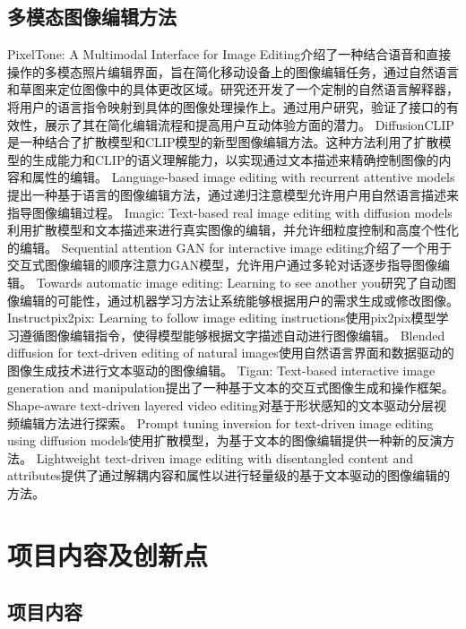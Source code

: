 \documentclass[a4paper,AutoFakeBold,oneside,12pt]{book}
\begin{document}
\subsection{多模态图像编辑方法}
PixelTone: A Multimodal Interface for Image Editing\cite{laput2013pixeltone}介绍了一种结合语音和直接操作的多模态照片编辑界面，旨在简化移动设备上的图像编辑任务，通过自然语言和草图来定位图像中的具体更改区域。研究还开发了一个定制的自然语言解释器，将用户的语言指令映射到具体的图像处理操作上。通过用户研究，验证了接口的有效性，展示了其在简化编辑流程和提高用户互动体验方面的潜力。
DiffusionCLIP\cite{kim2022diffusionclip}是一种结合了扩散模型和CLIP\cite{radford2021learning}模型的新型图像编辑方法。这种方法利用了扩散模型的生成能力和CLIP的语义理解能力，以实现通过文本描述来精确控制图像的内容和属性的编辑。
Language-based image editing with recurrent attentive models\cite{chen2018language}提出一种基于语言的图像编辑方法，通过递归注意模型允许用户用自然语言描述来指导图像编辑过程。
Imagic: Text-based real image editing with diffusion models\cite{kawar2023imagic}利用扩散模型和文本描述来进行真实图像的编辑，并允许细粒度控制和高度个性化的编辑。
Sequential attention GAN for interactive image editing\cite{cheng2020sequential}介绍了一个用于交互式图像编辑的顺序注意力GAN模型，允许用户通过多轮对话逐步指导图像编辑。
Towards automatic image editing: Learning to see another you\cite{ghodrati2015towards}研究了自动图像编辑的可能性，通过机器学习方法让系统能够根据用户的需求生成或修改图像。
Instructpix2pix: Learning to follow image editing instructions\cite{brooks2023instructpix2pix}使用pix2pix模型学习遵循图像编辑指令，使得模型能够根据文字描述自动进行图像编辑。
Blended diffusion for text-driven editing of natural images\cite{avrahami2022blended}使用自然语言界面和数据驱动的图像生成技术进行文本驱动的图像编辑。
Tigan: Text-based interactive image generation and manipulation\cite{zhou2022tigan}提出了一种基于文本的交互式图像生成和操作框架。
Shape-aware text-driven layered video editing\cite{lee2023shape}对基于形状感知的文本驱动分层视频编辑方法进行探索。
Prompt tuning inversion for text-driven image editing using diffusion models\cite{dong2023prompt}使用扩散模型，为基于文本的图像编辑提供一种新的反演方法。
Lightweight text-driven image editing with disentangled content and attributes\cite{li2023lightweight}提供了通过解耦内容和属性以进行轻量级的基于文本驱动的图像编辑的方法。

\section{项目内容及创新点}
\subsection{项目内容}
\end{document}
